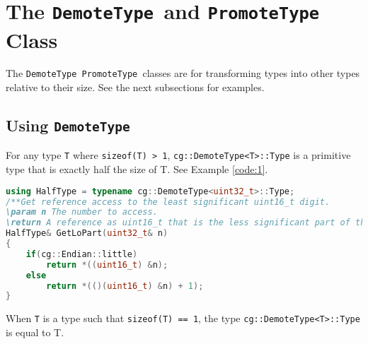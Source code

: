 \documentclass{article}
\newlength\tdima \newlength\tdimb \setlength\tdima{ \fboxsep+\fboxrule} \setlength\tdimb{-\fboxsep+\fboxrule}
\newcommand{\theobj}{\protect\Verb+DemoteType +}
\newcommand{\theobjt}{\protect\Verb+PromoteType +}
\begin{document}
\tableofcontents




\captionsetup[lstlisting]{format=listing,labelfont=white,textfont=white}
\lstset{style=cppstyle}

\section{The \theobj and \theobjt Class}

The \theobj \theobjt classes are for transforming types into other types relative to their size. See the next subsections for examples.

\subsection{Using \theobj}

For any type \Verb+T+ where \Verb+sizeof(T) > 1+,  \Verb+cg::DemoteType<T>::Type+ is a primitive type that is exactly half the size of T. See Example \vref{code:1}.

\begin{lstlisting}[language=C++, label=code:1, caption=Demoting types]
using HalfType = typename cg::DemoteType<uint32_t>::Type;
/**Get reference access to the least significant uint16_t digit.
\param n The number to access.
\return A reference as uint16_t that is the less significant part of the number.*/
HalfType& GetLoPart(uint32_t& n)
{
	if(cg::Endian::little)
		return *((uint16_t) &n);
	else
		return *(()(uint16_t) &n) + 1);
}
\end{lstlisting}

When \Verb+T+ is a type such that \Verb+sizeof(T) == 1+, the type \Verb+cg::DemoteType<T>::Type+ is equal to T.
\end{document}
